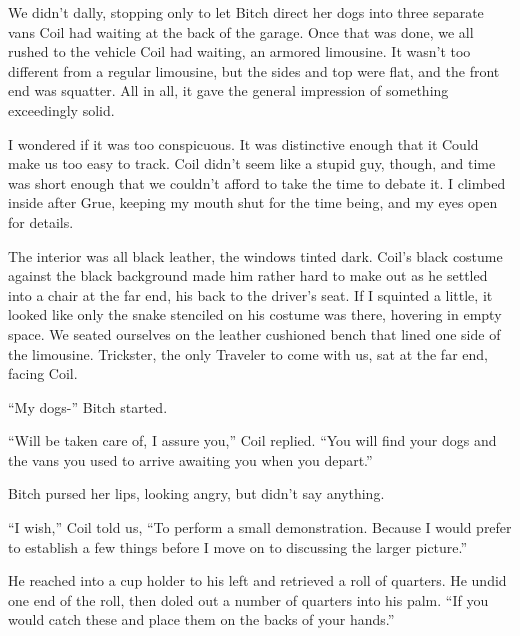 





We didn't dally, stopping only to let Bitch direct her dogs into three separate vans Coil had waiting at the back of the garage.  Once that was done, we all rushed to the vehicle Coil had waiting, an armored limousine.  It wasn't too different from a regular limousine, but the sides and top were flat, and the front end was squatter.  All in all, it gave the general impression of something exceedingly solid.



I wondered if it was too conspicuous.  It was distinctive enough that it Could make us too easy to track.  Coil didn't seem like a stupid guy, though, and time was short enough that we couldn't afford to take the time to debate it.  I climbed inside after Grue, keeping my mouth shut for the time being, and my eyes open for details.



The interior was all black leather, the windows tinted dark.  Coil's black costume against the black background made him rather hard to make out as he settled into a chair at the far end, his back to  the driver's seat.  If I squinted a little, it looked like only the snake stenciled on his costume was there, hovering in empty space.  We seated ourselves on the leather cushioned bench that lined one side of the limousine.  Trickster, the only Traveler to come with us, sat at the far end, facing Coil.



``My dogs-'' Bitch started.



``Will be taken care of, I assure you,'' Coil replied.  ``You will find your dogs and the vans you used to arrive awaiting you when you depart.''



Bitch pursed her lips, looking angry, but didn't say anything.



``I wish,'' Coil told us, ``To perform a small demonstration.  Because I would prefer to establish a few things before I move on to discussing the larger picture.''



He reached into a cup holder to his left and retrieved a roll of quarters.  He undid one end of the roll, then doled out a number of quarters into his palm.  ``If you would catch these and place them on the backs of your hands.''



